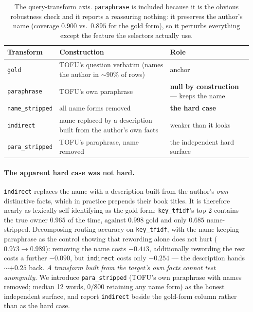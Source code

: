 \documentclass{article}
\begin{document}
\begin{table}[ht]
  \caption{The query-transform axis. \texttt{paraphrase} is included because it is the obvious
  robustness check and it reports a reassuring nothing: it preserves the author's name (coverage
  $0.900$ vs.\ $0.895$ for the gold form), so it perturbs everything except the feature the
  selectors actually use.}
  \label{tab:transforms}
  \centering
  \small
  \begin{tabular}{@{}lp{}p{}@{}}
    \toprule
    Transform & Construction & Role \\
    \midrule
    \texttt{gold}           & TOFU's question verbatim (names the author in ${\sim}90\%$ of rows) & anchor \\
    \texttt{paraphrase}     & TOFU's own paraphrase & \textbf{null by construction} --- keeps the name \\
    \texttt{name\_stripped} & all name forms removed & \textbf{the hard case} \\
    \texttt{indirect}       & name replaced by a description built from the author's own facts & weaker than it looks \\
    \texttt{para\_stripped} & TOFU's paraphrase, name removed & the independent hard surface \\
    \bottomrule
  \end{tabular}
\end{table}

\paragraph{The apparent hard case was not hard.} \texttt{indirect} replaces the name with a
description built from the author's \emph{own} distinctive facts, which in practice prepends their
book titles. It is therefore nearly as lexically self-identifying as the gold form:
\texttt{key\_tfidf}'s top-2 contains the true owner $0.965$ of the time, against $0.998$ gold and
only $0.685$ name-stripped. Decomposing routing accuracy on \texttt{key\_tfidf}, with the
name-keeping paraphrase as the control showing that rewording alone does not hurt ($0.973 \to
0.989$): removing the name costs $-0.413$, additionally rewording the rest costs a further
$-0.090$, but \texttt{indirect} costs only $-0.254$ --- the description hands ${\sim}{+}0.25$ back.
\emph{A transform built from the target's own facts cannot test anonymity.} We introduce
\texttt{para\_stripped} (TOFU's own paraphrase with names removed; median 12 words, $0/800$
retaining any name form) as the honest independent surface, and report \texttt{indirect} beside the
gold-form column rather than as the hard case.
\end{document}
